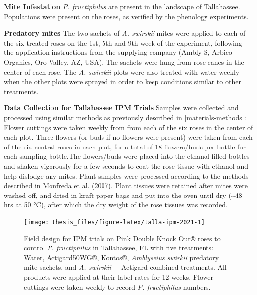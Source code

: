 \documentclass{ufdissertation}[overrideChapters] %
\begin{document}
{\textbf{Mite Infestation}
\emph{P. fructiphilus} are present in the landscape of Tallahassee. Populations were present on the roses, as verified by the phenology experiments.

\textbf{Predatory mites}
The two sachets of \emph{A. swirskii} mites were applied to each of the six treated roses on the 1st, 5th and 9th week of the experiment, following the application instructions from the supplying company (Ambly-S, Arbico Organics, Oro Valley, AZ, USA). The sachets were hung from rose canes in the center of each rose. The \emph{A. swirskii} plots were also treated with water weekly when the other plots were sprayed in order to keep conditions similar to other treatments.

\textbf{Data Collection for Tallahassee IPM Trials}
Samples were collected and processed using similar methods as previously described in \ref{materials-methods}: Flower cuttings were taken weekly from from each of the six roses in the center of each plot. Three flowers (or buds if no flowers were present) were taken from each of the six central roses in each plot, for a total of 18 flowers/buds per bottle for each sampling bottle.The flowers/buds were placed into the ethanol-filled bottles and shaken vigorously for a few seconds to coat the rose tissue with ethanol and help dislodge any mites. Plant samples were processed according to the methods described in Monfreda et al. (\protect\hyperlink{ref-Monfreda2007}{2007}). Plant tissues were retained after mites were washed off, and dried in kraft paper bags and put into the oven until dry (\textasciitilde48 hrs at 50 °C), after which the dry weight of the rose tissues was recorded.
\begin{figure}

{\centering \texttt{[image: thesis\_files/figure-latex/talla-ipm-2021-1]} 

}

\caption[Field design for IPM trials on Pink Double Knock Out® roses to control \textit{P. fructiphilus} in Tallahassee, FL with five treatments]{Field design for IPM trials on Pink Double Knock Out® roses to control \textit{P. fructiphilus} in Tallahassee, FL with five treatments: Water, Actigard50WG®, Kontos®, \textit{Amblyseius swirkii} predatory mite sachets, and \textit{A. swirskii} + Actigard combined treatments. All products were applied at their label rates for 12 weeks. Flower cuttings were taken weekly to record \textit{P. fructiphilus} numbers.}\label{fig:talla-ipm-2021}
\end{figure}
\hypertarget{analysis-of-field-trial-data}{%
}}
\end{document}
